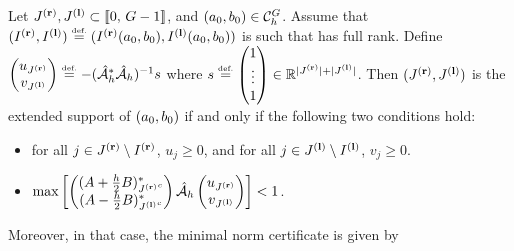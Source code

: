 \begin{lem}\label{lem-mu0}
  Let ${J^{\mathbf{(r)}}},{J^{\mathbf{(l)}}} \subset \llbracket 0,\,G-1 \rrbracket$, and $(a_0,b_0)\in\mathcal{C}_h^G$. Assume that $({I^{\mathbf{(r)}}},{I^{\mathbf{(l)}}})\stackrel{\mbox{\upshape\tiny def.}}{=} ({I^{\mathbf{(r)}}}(a_0,b_0),{I^{\mathbf{(l)}}}(a_0,b_0))$  is such that 
	has full rank. Define $\begin{pmatrix} u_{{J^{\mathbf{(r)}}}}\\v_{{J^{\mathbf{(l)}}}} \end{pmatrix} \stackrel{\mbox{\upshape\tiny def.}}{=} -({\hat{\mathcal{A}}_h}^*{\hat{\mathcal{A}}_h})^{-1}s$ where $s \stackrel{\mbox{\upshape\tiny def.}}{=} \begin{pmatrix}1\\\vdots\\ 1\end{pmatrix}\in \mathbb{R}^{|{J^{\mathbf{(r)}}}|+|{J^{\mathbf{(l)}}}|}$. Then $({J^{\mathbf{(r)}}},{J^{\mathbf{(l)}}})$ is the extended support of $(a_0,b_0)$ if and only if the following two conditions hold:
\begin{itemize}
  \item for all $j\in {J^{\mathbf{(r)}}}\setminus {I^{\mathbf{(r)}}}$, $u_j \geq 0$, and for all $j\in {J^{\mathbf{(l)}}}\setminus {I^{\mathbf{(l)}}}$, $v_j\geq 0$.
  \item $\max \left[\begin{pmatrix}({A}+\frac{h}{2}{B})_{{J^{\mathbf{(r)}}}^c}^* \\({A}-\frac{h}{2}{B})_{{J^{\mathbf{(l)}}}^c}^* \end{pmatrix} {\hat{\mathcal{A}}_h} \begin{pmatrix} u_{{J^{\mathbf{(r)}}}}\\v_{{J^{\mathbf{(l)}}}} \end{pmatrix}\right]<1$.
\end{itemize}
Moreover, in that case, the minimal norm certificate is given by 
\end{lem}


